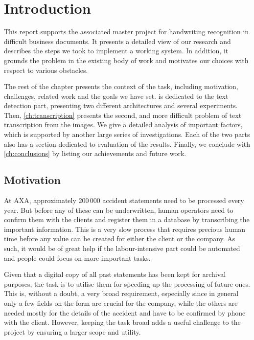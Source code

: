 \chapter{Introduction}\label{ch:intro}

This report supports the associated master project for handwriting recognition in difficult business documents. It presents a detailed view of our research and describes the steps we took to implement a working system. In addition, it grounds the problem in the existing body of work and motivates our choices with respect to various obstacles.

The rest of the chapter presents the context of the task, including motivation, challenges, related work and the goals we have set.  is dedicated to the text detection part, presenting two different architectures and several experiments. Then, \autoref{ch:transcription} presents the second, and more difficult problem of text transcription from the images. We give a detailed analysis of important factors, which is supported by another large series of investigations. Each of the two parts also has a section dedicated to evaluation of the results. Finally, we conclude with \autoref{ch:conclusions} by listing our achievements and future work.


\section{Motivation}
At AXA, approximately 200\,000 accident statements need to be processed every year. But before any of these can be underwritten, human operators need to confirm them with the clients and register them in a database by transcribing the important information. This is a very slow process that requires precious human time before any value can be created for either the client or the company. As such, it would be of great help if the labour-intensive part could be automated and people could focus on more important tasks.

Given that a digital copy of all past statements has been kept for archival purposes, the task is to utilise them for speeding up the processing of future ones. This is, without a doubt, a very broad requirement, especially since in general only a few fields on the form are crucial for the company, while the others are needed mostly for the details of the accident and have to be confirmed by phone with the client. However, keeping the task broad adds a useful challenge to the project by ensuring a larger scope and utility.

